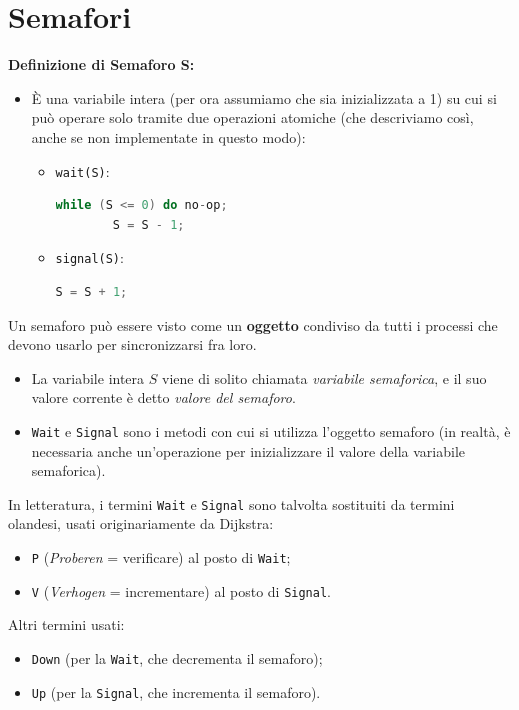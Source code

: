 \section{Semafori}
\textbf{Definizione di Semaforo S:}
\begin{itemize}
    \item È una variabile intera (per ora assumiamo che sia inizializzata a 1) su cui si può operare solo tramite due operazioni atomiche (che descriviamo così, anche se non implementate in questo modo):
    \begin{itemize}
        \item \texttt{wait(S)}: 
        \begin{lstlisting}[language=C]
        while (S <= 0) do no-op;
        S = S - 1;
        \end{lstlisting}
        \item \texttt{signal(S)}: 
        \begin{lstlisting}[language=C]
        S = S + 1;
        \end{lstlisting}
    \end{itemize}
\end{itemize}
Un semaforo può essere visto come un \textbf{oggetto} condiviso da tutti i processi che devono usarlo per sincronizzarsi fra loro.
\begin{itemize}
    \item La variabile intera $S$ viene di solito chiamata \textit{variabile semaforica}, e il suo valore corrente è detto \textit{valore del semaforo}.
    \item \texttt{Wait} e \texttt{Signal} sono i metodi con cui si utilizza l'oggetto semaforo (in realtà, è necessaria anche un'operazione per inizializzare il valore della variabile semaforica).
\end{itemize}
In letteratura, i termini \texttt{Wait} e \texttt{Signal} sono talvolta sostituiti da termini olandesi, usati originariamente da Dijkstra:
\begin{itemize}
    \item \texttt{P} (\textit{Proberen} = verificare) al posto di \texttt{Wait};
    \item \texttt{V} (\textit{Verhogen} = incrementare) al posto di \texttt{Signal}.
\end{itemize}
Altri termini usati:
\begin{itemize}
    \item \texttt{Down} (per la \texttt{Wait}, che decrementa il semaforo);
    \item \texttt{Up} (per la \texttt{Signal}, che incrementa il semaforo).
\end{itemize}

